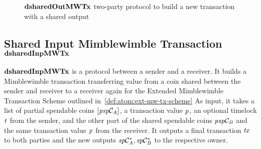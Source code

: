 \begin{figure}
    \begin{center}
    \end{center}
    \caption{$\mathbf{dsharedOutMWTx}$ two-party protocol to build a new transaction with a shared output} \label{fig:d-shared-out-mw-tx}
\end{figure}

\subsection{Shared Input Mimblewimble Transaction $\mathbf{dsharedInpMWTx}$} \label{subsec:atom:shared-inp-mw-tx}

$\mathbf{dsharedInpMWTx}$ is a protocol between a sender and a receiver.
It builds a Mimblewimble transaction transferring value from a coin shared between the sender and receiver to a receiver again for the Extended Mimblewimble Transaction Scheme outlined in~\cref{def:atom:ext-mw-tx-scheme}
As input, it takes a list of partial spendable coins $[\mathit{psp}\mathcal{C}_{\mathit{A}}]$, a transaction value $\mathit{p}$, an optional timelock $\mathit{t}$ from the sender, and the other part of the shared spendable coins $\mathit{psp}\mathcal{C}_{\mathit{B}}$ and the same transaction value $\mathit{p}$ from the receiver.
It outputs a final transaction $\mathit{tx}$ to both parties and the new outputs $\mathit{sp}\mathcal{C}_{\mathit{A}}^*, \mathit{sp}\mathcal{C}_{\mathit{B}}^*$ to the respective owner.

